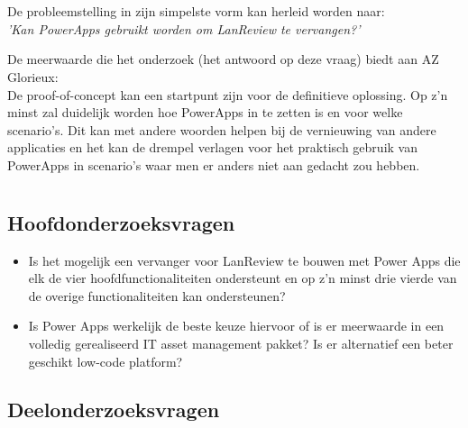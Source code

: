 \section{}
\label{sec:probleemstelling}

De probleemstelling in zijn simpelste vorm kan herleid worden naar:\\
\textit{'Kan PowerApps gebruikt worden om LanReview te vervangen?'}

De meerwaarde die het onderzoek (het antwoord op deze vraag) biedt aan AZ Glorieux:\\
De proof-of-concept kan een startpunt zijn voor de definitieve oplossing. Op z'n minst zal duidelijk worden hoe PowerApps in te zetten is en voor welke scenario's. Dit kan met andere woorden helpen bij de vernieuwing van andere applicaties en het kan de drempel verlagen voor het praktisch gebruik van PowerApps in scenario's waar men er anders niet aan gedacht zou hebben.

\section{}
\label{sec:onderzoeksvraag}

\subsection{Hoofdonderzoeksvragen}

\begin{itemize}
    \item Is het mogelijk een vervanger voor LanReview te bouwen met Power Apps die elk de vier hoofdfunctionaliteiten ondersteunt en op z'n minst drie vierde van de overige functionaliteiten kan ondersteunen?
    \item Is Power Apps werkelijk de beste keuze hiervoor of is er meerwaarde in een volledig gerealiseerd IT asset management pakket? Is er alternatief een beter geschikt low-code platform?
\end{itemize}

\subsection{Deelonderzoeksvragen}


